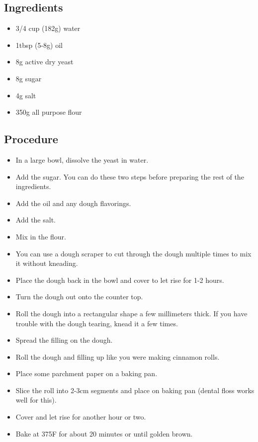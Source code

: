 \documentclass[10pt, openany]{book}
\begin{document}
\subsection{Ingredients}
\begin{itemize}
  \item 3/4 cup (182g) water
  \item 1tbsp (5-8g) oil
  \item 8g active dry yeast
  \item 8g sugar
  \item 4g salt
  \item 350g all purpose flour
\end{itemize}

\subsection{Procedure}
\begin{itemize}
  \item In a large bowl, dissolve the yeast in water.
  \item Add the sugar.  You can do these two steps before preparing the rest of the ingredients.
  \item Add the oil and any dough flavorings.
  \item Add the salt.
  \item Mix in the flour.
  \item You can use a dough scraper to cut through the dough multiple times to mix it without kneading.
  \item Place the dough back in the bowl and cover to let rise for 1-2 hours.
  \item Turn the dough out onto the counter top.
  \item Roll the dough into a rectangular shape a few millimeters thick.  If you have trouble with the dough tearing, knead it a few times.
  \item Spread the filling on the dough.
  \item Roll the dough and filling up like you were making cinnamon rolls.
  \item Place some parchment paper on a baking pan.
  \item Slice the roll into 2-3cm segments and place on baking pan (dental floss works well for this).
  \item Cover and let rise for another hour or two.
  \item Bake at 375\degree{}F for about 20 minutes or until golden brown.
\end{itemize}
\end{document}
